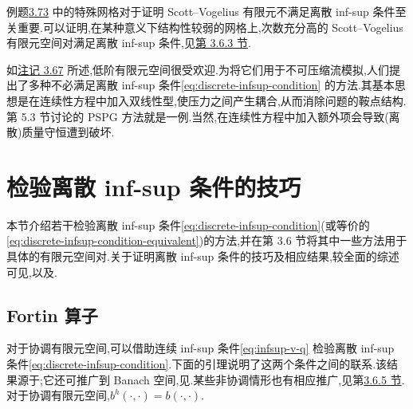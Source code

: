 \begin{note}\label{note:scott-vogelius-other-meshes}
例题\hyperref[ex:scott-vogelius-macroelement]{3.73} 中的特殊网格对于证明 Scott--Vogelius 有限元不满足离散 inf-sup 条件至关重要.可以证明,在某种意义下结构性较弱的网格上,次数充分高的 Scott--Vogelius 有限元空间对满足离散 inf-sup 条件,见\hyperref[sec:scott-vogelius]{第 3.6.3 节}.
\end{note}

\begin{note}\label{note:circumvent-discrete-infsup}
如\hyperref[note:low-order-finite-element-pairs]{注记 3.67} 所述,低阶有限元空间很受欢迎.为将它们用于不可压缩流模拟,人们提出了多种不必满足离散 inf-sup 条件\cref{eq:discrete-infsup-condition} 的方法.其基本思想是在连续性方程中加入双线性型,使压力之间产生耦合,从而消除问题的鞍点结构.第 5.3 节讨论的 PSPG 方法就是一例.当然,在连续性方程中加入额外项会导致(离散)质量守恒遭到破坏.
\end{note}

\section{检验离散 inf-sup 条件的技巧}\label{sec:checking-discrete-infsup}

\begin{note}[内容]\label{note:fortin-section-contents}
本节介绍若干检验离散 inf-sup 条件\cref{eq:discrete-infsup-condition}(或等价的\cref{eq:discrete-infsup-condition-equivalent})的方法,并在第 3.6 节将其中一些方法用于具体的有限元空间对.关于证明离散 inf-sup 条件的技巧及相应结果,较全面的综述可见\textcite{Boffi2008},以及\textcite[第 8.4、8.5 节]{Boffi2013}.
\end{note}

\subsection{Fortin 算子}\label{subsec:fortin-operator}

\begin{note}\label{note:continuous-discrete-infsup-connection}
对于协调有限元空间,可以借助连续 inf-sup 条件\cref{eq:infsup-v-q} 检验离散 inf-sup 条件\cref{eq:discrete-infsup-condition}.下面的引理说明了这两个条件之间的联系.该结果源于\textcite{Fortin1977};它还可推广到 Banach 空间,见\textcite[引理 4.19]{ErnGuermond2004}.某些非协调情形也有相应推广,见第\hyperref[sec:lowest-order-nonconforming]{3.6.5 节}.对于协调有限元空间,$b^h(\cdot,\cdot)=b(\cdot,\cdot)$.
\end{note}

